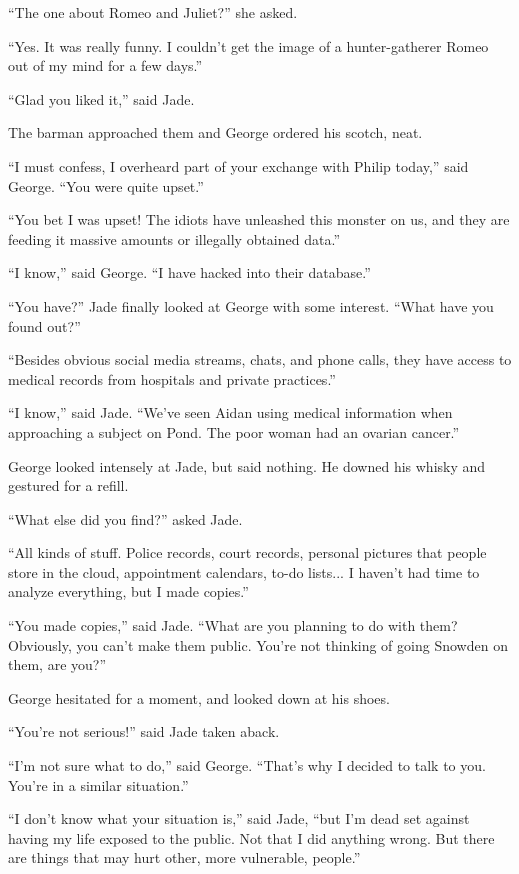 \documentclass{memoir}
\begin{document}
``The one about Romeo and Juliet?'' she asked.

``Yes. It was really funny. I couldn't get the image of a hunter-gatherer Romeo out of my mind for a few days.''

``Glad you liked it,'' said Jade.

The barman approached them and George ordered his scotch, neat.

``I must confess, I overheard part of your exchange with Philip today,'' said George. ``You were quite upset.''

``You bet I was upset! The idiots have unleashed this monster on us, and they are feeding it massive amounts or illegally obtained data.''

``I know,'' said George. ``I have hacked into their database.''

``You have?'' Jade finally looked at George with some interest. ``What have you found out?''

``Besides obvious social media streams, chats, and phone calls, they have access to medical records from hospitals and private practices.''

``I know,'' said Jade. ``We've seen Aidan using medical information when approaching a subject on Pond. The poor woman had an ovarian cancer.'' 

George looked intensely at Jade, but said nothing. He downed his whisky and gestured for a refill.

``What else did you find?'' asked Jade.

``All kinds of stuff. Police records, court records, personal pictures that people store in the cloud, appointment calendars, to-do lists... I haven't had time to analyze everything, but I made copies.''

``You made copies,'' said Jade. ``What are you planning to do with them? Obviously, you can't make them public. You're not thinking of going Snowden on them, are you?''

George hesitated for a moment, and looked down at his shoes.

``You're not serious!'' said Jade taken aback.

``I'm not sure what to do,'' said George. ``That's why I decided to talk to you. You're in a similar situation.''

``I don't know what your situation is,'' said Jade, ``but I'm dead set against having my life exposed to the public. Not that I did anything wrong. But there are things that may hurt other, more vulnerable, people.''
\end{document}
